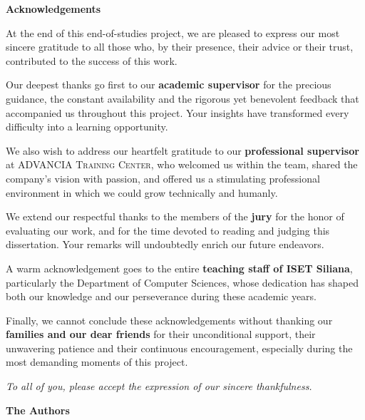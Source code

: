 
\thispagestyle{empty}
\vspace*{1cm}

\begin{center}
{\Huge\bfseries\color{primary} Acknowledgements}\\[0.4cm]
\end{center}

\vspace{1cm}

\noindent
At the end of this end-of-studies project, we are pleased to express our most sincere gratitude to all those who, by their presence, their advice or their trust, contributed to the success of this work.

\medskip
\noindent
Our deepest thanks go first to our \textbf{academic supervisor} for the precious guidance, the constant availability and the rigorous yet benevolent feedback that accompanied us throughout this project. Your insights have transformed every difficulty into a learning opportunity.

\medskip
\noindent
We also wish to address our heartfelt gratitude to our \textbf{professional supervisor} at \textsc{ADVANCIA Training Center}, who welcomed us within the team, shared the company's vision with passion, and offered us a stimulating professional environment in which we could grow technically and humanly.

\medskip
\noindent
We extend our respectful thanks to the members of the \textbf{jury} for the honor of evaluating our work, and for the time devoted to reading and judging this dissertation. Your remarks will undoubtedly enrich our future endeavors.

\medskip
\noindent
A warm acknowledgement goes to the entire \textbf{teaching staff of ISET Siliana}, particularly the Department of Computer Sciences, whose dedication has shaped both our knowledge and our perseverance during these academic years.

\medskip
\noindent
Finally, we cannot conclude these acknowledgements without thanking our \textbf{families and our dear friends} for their unconditional support, their unwavering patience and their continuous encouragement, especially during the most demanding moments of this project.

\bigskip
\noindent
\textit{To all of you, please accept the expression of our sincere thankfulness.}

\vspace{1cm}
\hfill \textbf{The Authors}

\cleardoublepage
